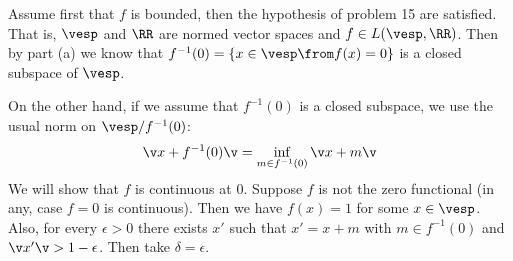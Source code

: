 Assume first that $f$ is bounded, then the hypothesis of problem 15 are satisfied. That is, $\vesp$ and $\RR$ are normed vector spaces and $f\in L(\vesp, \RR)$. Then by part (a) we know that $f^{-1}(0) = \{ x\in \vesp \from f(x) =0 \}$ is a closed subspace of $\vesp$.

On the other hand, if we assume that $f^{-1}(0)$ is a closed subspace, we use the usual norm on $\vesp/f^{-1}(0)$:
$$\v x+f^{-1}(0)\v = \inf_{m\in f^{-1}(0)}\v x + m\v$$
We will show that $f$ is continuous at 0. Suppose $f$ is not the zero functional (in any, case $f=0$ is continuous). Then we have $f(x)=1$ for some $x\in\vesp$. Also, for every $\epsilon >0$ there exists $x'$ such that $x'=x+m$ with $m\in f^{-1}(0)$ and $\v x' \v > 1 - \epsilon$. Then take $\delta = \epsilon$.

